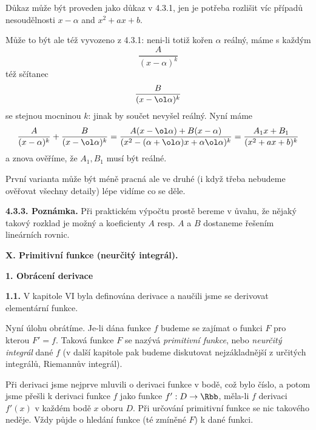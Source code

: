 \documentclass[12pt]{article}
\begin{document}
{{   Důkaz} může být proveden jako důkaz v 4.3.1, jen je potřeba rozlišit víc případů nesoudělnosti $x-\alpha$ and $x^2+ax+b$. 
   
   Může to být ale též vyvozeno z 4.3.1: neni-li totiž kořen $\alpha$ reálný, máme s každým 
   $$
    \frac{A}{(x-\alpha)^k}
    $$
   též sčítanec
    $$
    \frac{B}{(x-\ol\alpha)^k}
    $$
   se stejnou mocninou $k$: jinak by součet nevyšel reálný. Nyní máme
    $$    \frac{A}{(x-\alpha)^k}+\frac{B}{(x-\ol\alpha)^k}=\frac{A(x-\ol\alpha)+B(x-\alpha)}{(x^2-(\alpha+\ol\alpha)x+\alpha\ol\alpha)^k}=
    \frac{A_1x+B_1}{(x^2+ax+b)^k}
    $$
   a znova ověříme, že $A_1,B_1$ musí být reálné.
    
    První varianta může být méně pracná ale ve druhé (i když třeba nebudeme ověřovat všechny detaily) lépe vidíme co se děle. \sq
    
    \medskip
    
    {\bf 4.3.3. Poznámka.} Při praktickém výpočtu prostě bereme v ůvahu, že nějaký takový rozklad je možný a koeficienty $A$ resp. $A$ a $B$ dostaneme řešením lineárních rovnic.
    
    \newpage
		
			

    
    
     \centerline{\Large\bf X. Primitivní funkce (neurčitý integrál).} 
 
 \vskip10mm
 
 
 \def\d{\text{d}}
 
 
 
 {\large\bf 1. Obrácení derivace}
 
 \bigskip
 
 {\bf 1.1.} V kapitole VI byla definována derivace
 a naučili jsme se derivovat elementární funkce.
 
 Nyní úlohu obrátíme. Je-li dána funkce $f$ budeme se zajímat o funkci $F$ pro kterou $F'=f$. Taková funkce $F$ se nazývá
 {\em primitivní funkce}, nebo {\em neurčitý integrál} dané $f$ (v další kapitole pak budeme diskutovat nejzákladnější z určitých integrálů, Riemannův integrál).
 
 Při derivaci jsme nejprve mluvili o derivaci funkce v bodě, což bylo číslo, a potom jsme přešli
k derivaci funkce $f$ jako funkce
 $f':D\to\Rbb$, měla-li $f$ derivaci $f'(x)$ v každém bodě $x$ oboru
  $D$. Při určování primitivní funkce se nic takového neděje.
 Vždy půjde o hledání funkce (té zmíněné $F$) k dané funkci.
 
 \bigskip
 
}
\end{document}
